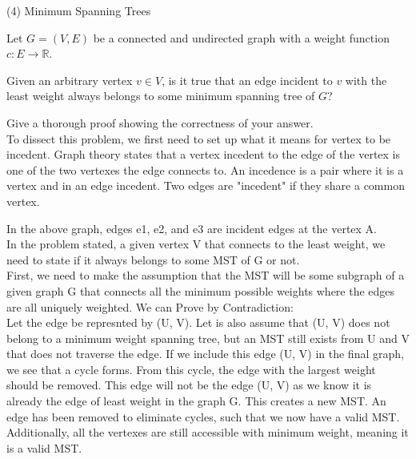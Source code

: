 \documentclass[11pt]{amsart}
\begin{document}
\newpage

(4) Minimum Spanning Trees\medskip

Let $G=(V,E)$ be a connected and undirected graph with a weight function $c\colon E \to \mathbb{R}$. \medskip

Given an arbitrary vertex $v\in V$, is it true that an edge incident to $v$ with the least weight always belongs to some minimum spanning tree of $G$?\medskip

Give a thorough proof showing the correctness of your answer.\\

\hspace*{15mm}To dissect this problem, we first need to set up what it means for vertex to be incedent. Graph theory states that a vertex incedent to the edge of the vertex is one of the two vertexes the edge connects to. An incedence is a pair where it is a vertex and in an edge incedent. Two edges are "incedent" if they share a common vertex.\\
\begin{center}
\end{center}
\hspace*{15mm}In the above graph, edges e1, e2, and e3 are incident edges at the vertex A.\\
In the problem stated, a given vertex V that connects to the least weight, we need to state if it always belongs to some MST of G or not.\\
\hspace*{15mm}First, we need to make the assumption that the MST will be some subgraph of a given graph G that connects all the minimum possible weights where the edges are all uniquely weighted.
We can Prove by Contradiction:\\
\hspace*{15mm}Let the edge be represnted by (U, V). Let is also assume that (U, V) does not belong to a minimum weight spanning tree, but an MST still exists from U and V that does not traverse the edge. If we include this edge (U, V) in the final graph, we see that a cycle forms. From this cycle, the edge with the largest weight should be removed. This edge will not be the edge (U, V) as we know it is already the edge of least weight in the graph G. This creates a new MST. An edge has been removed to eliminate cycles, such that we now have a valid MST. Additionally, all the vertexes are still accessible with minimum weight, meaning it is a valid MST.\\
\end{document}
